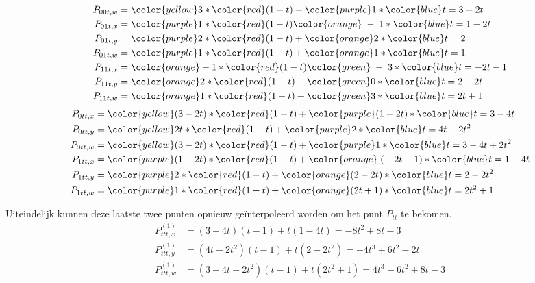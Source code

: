 \begin{enumerate}
{\begin{itemize}
\begin{equation*}
\begin{split}
					P_{00t, w} & = {\color{yellow}3} * {\color{red}(1 - t)} + {\color{purple}1} * {\color{blue}t} = 3 - 2t\\
					P_{01t, x} & = {\color{purple}1} * {\color{red}(1 - t)} {\color{orange}\;- \;1} * {\color{blue}t} = 1 - 2t \\
					P_{01t, y} & = {\color{purple}2} * {\color{red}(1 - t)} + {\color{orange}2} * {\color{blue}t} = 2 \\
					P_{01t, w} & = {\color{purple}1} * {\color{red}(1 - t)} + {\color{orange}1} * {\color{blue}t} = 1 \\
					P_{11t, x} & = {\color{orange}- 1} * {\color{red}(1 - t)} {\color{green}\;-\;3} * {\color{blue}t} = -2t - 1 \\
					P_{11t, y} & = {\color{orange}2} * {\color{red}(1 - t)} + {\color{green}0} * {\color{blue}t} = 2 - 2t \\
					P_{11t, w} & = {\color{orange}1} * {\color{red}(1 - t)} + {\color{green}3} * {\color{blue}t} = 2t + 1 \\
				\end{split}
			\end{equation*}
			\begin{equation*}
				\begin{split}
					P_{0tt, x} & = {\color{yellow}(3-2t)} * {\color{red}(1 - t)} + {\color{purple}(1 - 2t)} * {\color{blue}t} = 3 - 4t \\
					P_{0tt, y} & = {\color{yellow}2t} * {\color{red}(1 - t)} + {\color{purple}2} * {\color{blue}t} = 4t - 2t^2 \\
					P_{0tt, w} & = {\color{yellow}(3 - 2t)} * {\color{red}(1 - t)} + {\color{purple}1} * {\color{blue}t} = 3 - 4t +2t^2\\
					P_{1tt, x} & = {\color{purple}(1 - 2t)} * {\color{red}(1 - t)} + {\color{orange}\;(-\;2t - 1)} * {\color{blue}t} = 1 - 4t \\
					P_{1tt, y} & = {\color{purple}2} * {\color{red}(1 - t)} + {\color{orange}(2 - 2t)} * {\color{blue}t} = 2 -2t^2 \\
					P_{1tt, w} & = {\color{purple}1} * {\color{red}(1 - t)} + {\color{orange}(2t + 1)} * {\color{blue}t} = 2t^2 + 1 \\
				\end{split}
			\end{equation*}

			Uiteindelijk kunnen deze laatste twee punten opnieuw geïnterpoleerd worden om het punt $P_{tt}$ te bekomen.
			\begin{equation*}
				\begin{split}
					P_{ttt, x}^{(1)} & = (3-4t)(t-1) + t(1-4t) = -8t^2 +8t - 3 \\
					P_{ttt, y}^{(1)} & = (4t-2t^2)(t-1)+ t(2-2t^2) = -4t^3 + 6t^2 - 2t\\
					P_{ttt, w}^{(1)} & = (3-4t+2t^2)(t-1) + t(2t^2 + 1) = 4t^3 -6t^2 +8t - 3
				\end{split}
			\end{equation*}


\end{itemize}}
\end{enumerate}
